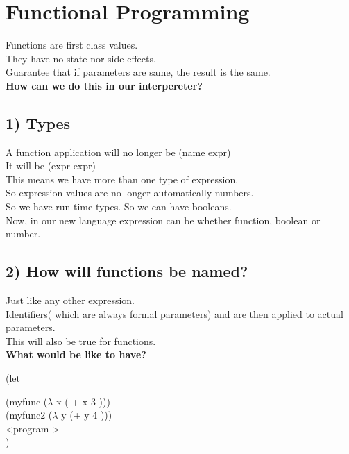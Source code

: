 \documentclass{article}
\begin{document}
\section{Functional Programming}
\begin{flushleft}
Functions are first class values.\\
They have no state nor side effects.\\
Guarantee that if parameters are same, the result is the same.\\

\vspace{2mm}
\textbf{How can we do this in our interpereter?}

\subsection*{1) Types}
A function application will no longer be (name expr)\\
It will be (expr expr)\\
This means we have more than one type of expression.\\
So expression values are no longer automatically numbers.\\
So we have run time types. So we can have booleans.\\

Now, in our new language expression can be whether function, boolean or number.\\

\subsection*{2) How will functions be named?}
Just like any other expression.\\
Identifiers( which are always formal parameters) and are then applied to actual parameters.\\
This will also be true for functions.\\

\vspace{5mm}
\textbf{What would be like to have?}


(let
   
  \hspace{1cm}(myfunc ($\lambda$ x ( + x 3 )))\\
  \hspace{1cm}(myfunc2 ($\lambda$ y (+ y 4 )))\\
   
  \hspace{1cm}\textless program \textgreater
   \\)


\end{flushleft}
\end{document}
